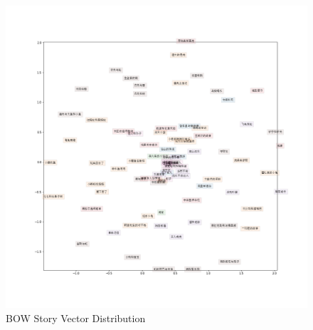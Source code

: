 \documentclass[sigconf]{acmart}
\begin{document}
\begin{figure}
\includegraphics[width = 1.\textwidth]{story_vec.png}
\caption{BOW Story Vector Distribution}
\label{fig:story_vec}
\end{figure}




\end{document}
